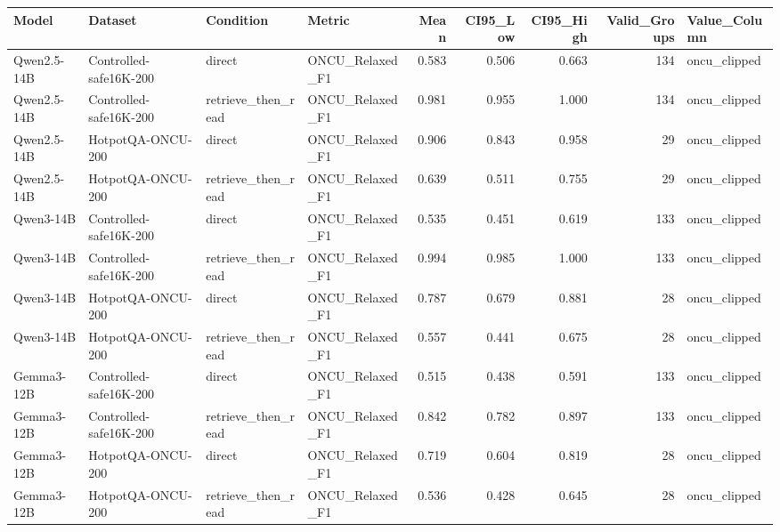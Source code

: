 \begin{tabular}{llllrrrrl}
\toprule
Model & Dataset & Condition & Metric & Mean & CI95_Low & CI95_High & Valid_Groups & Value_Column \\
\midrule
Qwen2.5-14B & Controlled-safe16K-200 & direct & ONCU_Relaxed_F1 & 0.583 & 0.506 & 0.663 & 134 & oncu_clipped \\
Qwen2.5-14B & Controlled-safe16K-200 & retrieve_then_read & ONCU_Relaxed_F1 & 0.981 & 0.955 & 1.000 & 134 & oncu_clipped \\
Qwen2.5-14B & HotpotQA-ONCU-200 & direct & ONCU_Relaxed_F1 & 0.906 & 0.843 & 0.958 & 29 & oncu_clipped \\
Qwen2.5-14B & HotpotQA-ONCU-200 & retrieve_then_read & ONCU_Relaxed_F1 & 0.639 & 0.511 & 0.755 & 29 & oncu_clipped \\
Qwen3-14B & Controlled-safe16K-200 & direct & ONCU_Relaxed_F1 & 0.535 & 0.451 & 0.619 & 133 & oncu_clipped \\
Qwen3-14B & Controlled-safe16K-200 & retrieve_then_read & ONCU_Relaxed_F1 & 0.994 & 0.985 & 1.000 & 133 & oncu_clipped \\
Qwen3-14B & HotpotQA-ONCU-200 & direct & ONCU_Relaxed_F1 & 0.787 & 0.679 & 0.881 & 28 & oncu_clipped \\
Qwen3-14B & HotpotQA-ONCU-200 & retrieve_then_read & ONCU_Relaxed_F1 & 0.557 & 0.441 & 0.675 & 28 & oncu_clipped \\
Gemma3-12B & Controlled-safe16K-200 & direct & ONCU_Relaxed_F1 & 0.515 & 0.438 & 0.591 & 133 & oncu_clipped \\
Gemma3-12B & Controlled-safe16K-200 & retrieve_then_read & ONCU_Relaxed_F1 & 0.842 & 0.782 & 0.897 & 133 & oncu_clipped \\
Gemma3-12B & HotpotQA-ONCU-200 & direct & ONCU_Relaxed_F1 & 0.719 & 0.604 & 0.819 & 28 & oncu_clipped \\
Gemma3-12B & HotpotQA-ONCU-200 & retrieve_then_read & ONCU_Relaxed_F1 & 0.536 & 0.428 & 0.645 & 28 & oncu_clipped \\
\bottomrule
\end{tabular}
